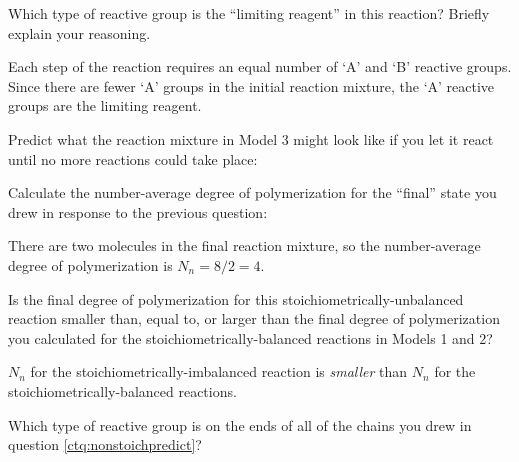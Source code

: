 \begin{activity}
\begin{ctqs}
			\begin{solution}[1in]
			\end{solution}
		
		\question Which type of reactive group is the ``limiting reagent'' in this reaction?  Briefly explain your reasoning.
		
			\begin{solution}[1in]
				Each step of the reaction requires an equal number of `A' and `B' reactive groups. Since there are fewer `A' groups in the initial reaction mixture, the `A' reactive groups are the limiting reagent.
			\end{solution}
		
		\question \label{ctq:nonstoichpredict} Predict what the reaction mixture in Model 3 might look like if you let it react until no more reactions could take place:
		
\begin{solution}
\end{solution}
		
		\question Calculate the number-average degree of polymerization for the ``final'' state you drew in response to the previous question:
		
		\begin{solution}[1in]
			There are two molecules in the final reaction mixture, so the number-average degree of polymerization is $N_n = 8/2 = 4$.
		\end{solution}
		
		\question Is the final degree of polymerization for this stoichiometrically-unbalanced reaction smaller than, equal to, or larger than the final degree of polymerization you calculated for the stoichiometrically-balanced reactions in Models 1 and 2?
		
		\begin{solution}[1in]
			$N_n$ for the stoichiometrically-imbalanced reaction is \emph{smaller} than $N_n$ for the stoichiometrically-balanced reactions.
		\end{solution}
		
		\question Which type of reactive group is on the ends of all of the chains you drew in question \ref{ctq:nonstoichpredict}?
		

\end{ctqs}
\end{activity}
